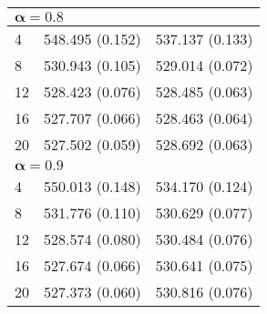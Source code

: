 \begin{table}[htbp]
\begin{center}
\begin{tabular}{lll}
\multicolumn{3}{l}{$\boldsymbol{\alpha = 0.8}$}                                                                                         \\ \hline
\multicolumn{1}{l|}{4}                 & \multicolumn{1}{l|}{548.495 (0.152)}              & 537.137 (0.133)            \\
\multicolumn{1}{l|}{8}                 & \multicolumn{1}{l|}{530.943 (0.105)}              & 529.014 (0.072)            \\
\multicolumn{1}{l|}{12}                & \multicolumn{1}{l|}{528.423 (0.076)}              & 528.485 (0.063)            \\
\multicolumn{1}{l|}{16}                & \multicolumn{1}{l|}{527.707 (0.066)}              & 528.463 (0.064)            \\
\multicolumn{1}{l|}{20}                & \multicolumn{1}{l|}{527.502 (0.059)}              & 528.692 (0.063)            \\ \hline
\multicolumn{3}{l}{$\boldsymbol{\alpha = 0.9}$}                                                                                         \\ \hline
\multicolumn{1}{l|}{4}                 & \multicolumn{1}{l|}{550.013 (0.148)}              & 534.170 (0.124)            \\
\multicolumn{1}{l|}{8}                 & \multicolumn{1}{l|}{531.776 (0.110)}              & 530.629 (0.077)            \\
\multicolumn{1}{l|}{12}                & \multicolumn{1}{l|}{528.574 (0.080)}              & 530.484 (0.076)            \\
\multicolumn{1}{l|}{16}                & \multicolumn{1}{l|}{527.674 (0.066)}              & 530.641 (0.075)            \\
\multicolumn{1}{l|}{20}                & \multicolumn{1}{l|}{527.373 (0.060)}              & 530.816 (0.076)           
\end{tabular}
\end{center}
\end{table}